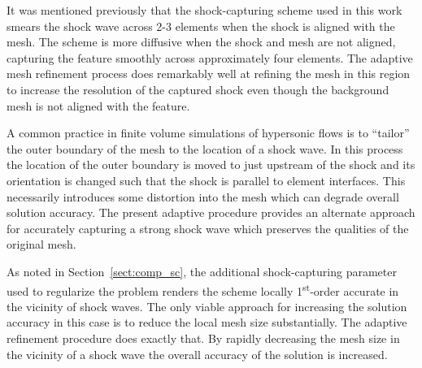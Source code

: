 It was mentioned previously that the shock-capturing scheme used in this work smears the shock wave across 2-3 elements when the shock is aligned with the mesh.  The scheme is more diffusive when the shock and mesh are not aligned, capturing the feature smoothly across approximately four elements.  The adaptive mesh refinement process does remarkably well at refining the mesh in this region to increase the resolution of the captured shock even though the background mesh is not aligned with the feature.

A common practice in finite volume simulations of hypersonic flows is to ``tailor'' the outer boundary of the mesh to the location of a shock wave.  In this process the location of the outer boundary is moved to just upstream of the shock and its orientation is changed such that the shock is parallel to element interfaces.  This necessarily introduces some distortion into the mesh which can degrade overall solution accuracy.  The present adaptive procedure provides an alternate approach for accurately capturing a strong shock wave which preserves the qualities of the original mesh.

As noted in Section~\ref{sect:comp_sc}, the additional shock-capturing parameter used to regularize the problem renders the scheme locally 1\textsuperscript{st}-order accurate in the vicinity of shock waves.  The only viable approach for increasing the solution accuracy in this case is to reduce the local mesh size substantially.  The adaptive refinement procedure does exactly that.  By rapidly decreasing the mesh size in the vicinity of a shock wave the overall accuracy of the solution is increased.

